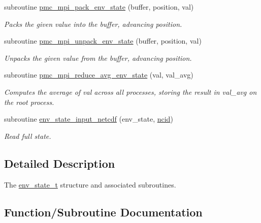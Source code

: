 \begin{DoxyCompactItemize}
subroutine \mbox{\hyperlink{namespacepmc__env__state_a480b54f036d88d6640bf278ce8677987}{pmc\+\_\+mpi\+\_\+pack\+\_\+env\+\_\+state}} (buffer, position, val)
\begin{DoxyCompactList}\small\item\em Packs the given value into the buffer, advancing position. \end{DoxyCompactList}\item 
subroutine \mbox{\hyperlink{namespacepmc__env__state_a29321768e4beec8bedc30f795b89a945}{pmc\+\_\+mpi\+\_\+unpack\+\_\+env\+\_\+state}} (buffer, position, val)
\begin{DoxyCompactList}\small\item\em Unpacks the given value from the buffer, advancing position. \end{DoxyCompactList}\item 
subroutine \mbox{\hyperlink{namespacepmc__env__state_a4c7aa1ae763cf16b0380f1bcaaa4bff5}{pmc\+\_\+mpi\+\_\+reduce\+\_\+avg\+\_\+env\+\_\+state}} (val, val\+\_\+avg)
\begin{DoxyCompactList}\small\item\em Computes the average of val across all processes, storing the result in val\+\_\+avg on the root process. \end{DoxyCompactList}\item 
subroutine \mbox{\hyperlink{namespacepmc__env__state_a0d8b675986137899087a12f1c7abe24b}{env\+\_\+state\+\_\+input\+\_\+netcdf}} (env\+\_\+state, \mbox{\hyperlink{fractal_8_f90_a4e89f3f850921ff84a6dfce8b166ad50}{ncid}})
\begin{DoxyCompactList}\small\item\em Read full state. \end{DoxyCompactList}\end{DoxyCompactItemize}


\subsection{Detailed Description}
The \mbox{\hyperlink{structpmc__env__state_1_1env__state__t}{env\+\_\+state\+\_\+t}} structure and associated subroutines. 

\subsection{Function/\+Subroutine Documentation}
\mbox{\label{namespacepmc__env__state_a400b3cc0c7eeee1a0b88f59ea59a8568}} 
